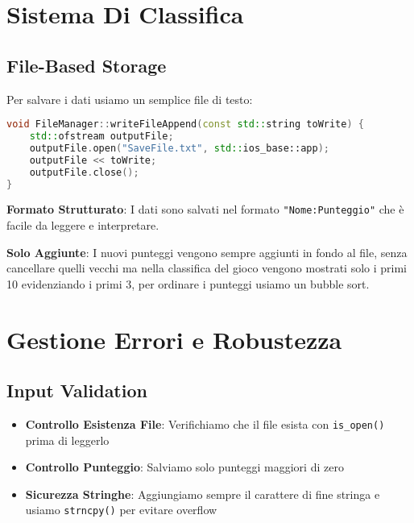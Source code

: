 \documentclass[a4paper,12pt]{article}
\begin{document}
\section{Sistema Di Classifica}

\subsection{File-Based Storage}

Per salvare i dati usiamo un semplice file di testo:

\begin{lstlisting}[language=C++]
void FileManager::writeFileAppend(const std::string toWrite) {
    std::ofstream outputFile; 
    outputFile.open("SaveFile.txt", std::ios_base::app);
    outputFile << toWrite;
    outputFile.close();
}
\end{lstlisting}

\textbf{Formato Strutturato}: I dati sono salvati nel formato \texttt{"Nome:Punteggio"} che è facile da leggere e interpretare.

\textbf{Solo Aggiunte}: I nuovi punteggi vengono sempre aggiunti in fondo al file, senza cancellare quelli vecchi ma nella classifica del gioco vengono mostrati solo i primi 10 evidenziando i primi 3, per ordinare i punteggi usiamo un bubble sort.

\section{Gestione Errori e Robustezza}

\subsection{Input Validation}

\begin{itemize}
    \item \textbf{Controllo Esistenza File}: Verifichiamo che il file esista con \texttt{is\_open()} prima di leggerlo
    \item \textbf{Controllo Punteggio}: Salviamo solo punteggi maggiori di zero
    \item \textbf{Sicurezza Stringhe}: Aggiungiamo sempre il carattere di fine stringa e usiamo \texttt{strncpy()} per evitare overflow
\end{itemize}
\end{document}
